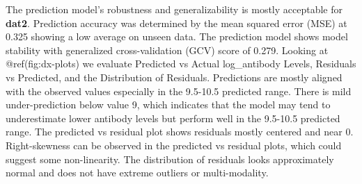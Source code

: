 \documentclass[
]{article}
\begin{document}
The prediction model's robustness and generalizability is mostly
acceptable for \textbf{dat2}. Prediction accuracy was determined by the
mean squared error (MSE) at 0.325 showing a low average on unseen data.
The prediction model shows model stability with generalized
cross-validation (GCV) score of 0.279. Looking at @ref(fig:dx-plots) we
evaluate Predicted vs Actual log\_antibody Levels, Residuals vs
Predicted, and the Distribution of Residuals. Predictions are mostly
aligned with the observed values especially in the 9.5-10.5 predicted
range. There is mild under-prediction below value 9, which indicates
that the model may tend to underestimate lower antibody levels but
perform well in the 9.5-10.5 predicted range. The predicted vs residual
plot shows residuals mostly centered and near 0. Right-skewness can be
observed in the predicted vs residual plots, which could suggest some
non-linearity. The distribution of residuals looks approximately normal
and does not have extreme outliers or multi-modality.

\newpage
\end{document}

